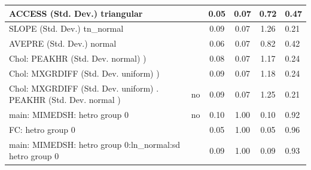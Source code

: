 \begin{table}
\begin{center}
\begin{tabular}{|l|l|c|c|c|l|}
			\hline
			ACCESS (Std. Dev.) triangular &  & 0.05 & 0.07 & 0.72 & 0.47 \\
			\hline
			SLOPE (Std. Dev.) tn_normal &  & 0.09 & 0.07 & 1.26 & 0.21 \\
			\hline
			AVEPRE (Std. Dev.) normal &  & 0.06 & 0.07 & 0.82 & 0.42 \\
			\hline
			 Chol: PEAKHR (Std. Dev. normal) ) &  & 0.08 & 0.07 & 1.17 & 0.24 \\
			\hline
			 Chol: MXGRDIFF (Std. Dev. uniform) ) &  & 0.09 & 0.07 & 1.18 & 0.24 \\
			\hline
			 Chol: MXGRDIFF (Std. Dev. uniform) . PEAKHR (Std. Dev.   normal ) & no & 0.09 & 0.07 & 1.25 & 0.21 \\
			\hline
			main: MIMEDSH: hetro group 0 & no & 0.10 & 1.00 & 0.10 & 0.92 \\
			\hline
			FC: hetro group 0 &  & 0.05 & 1.00 & 0.05 & 0.96 \\
			\hline
			main: MIMEDSH: hetro group 0:ln_normal:sd  hetro group 0 &  & 0.09 & 1.00 & 0.09 & 0.93 \\
			\hline
		\end{tabular}
	\end{center}
\end{table}